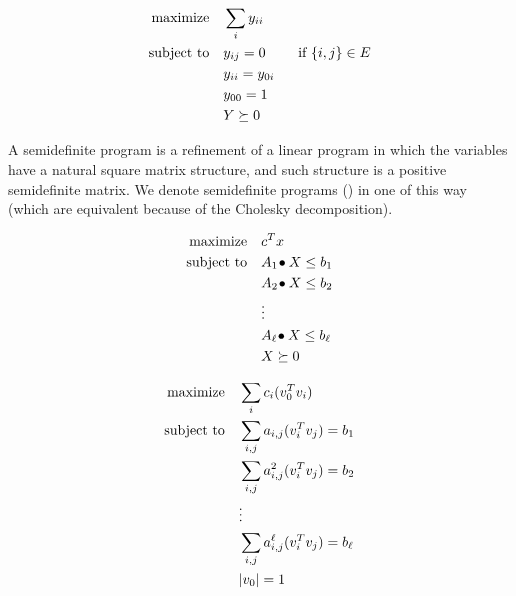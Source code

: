 \documentclass[a4paper,twoside,justified]{tufte-handout}
\begin{document}
\begin{alignat*}{2}
  \text{maximize}\hspace{1em}& \sum_{i}y_{ii}\\
  \text{subject to}\hspace{1em}& y_{ij} =0 \qquad \text{\ if $\{i,j\}\in E$}\\
  & y_{ii} = y_{0i} \\
  & y_{00} = 1\\
  & Y \succeq 0
\end{alignat*}

A semidefinite program is a refinement of a linear program in which
the variables have a natural square matrix structure, and such
structure is a positive semidefinite matrix. We denote semidefinite
programs (\sdp) in one of this way (which are equivalent because of
the Cholesky decomposition).

\begin{figure}
\begin{minipage}[t]{0.5\textwidth}
\begin{alignat*}{2}
  \text{maximize}\hspace{1em}& c^{T}x\\
  \text{subject to}\hspace{1em}& {A_{1}}\!\bullet{X} \leq b_{1}\\
  & {A_{2}}\!\bullet{X} \leq b_{2}\\
  & \vdots \\
  & {A_{\ell}}\!\bullet{X} \leq b_{\ell}\\
  & X \succeq 0
\end{alignat*}
\end{minipage}
\begin{minipage}[t]{0.5\textwidth}
\begin{alignat*}{2}
  \text{maximize}\hspace{1em}& \sum_{i}c_{i} (v_{0}^{T}v_{i}) \\
  \text{subject to}\hspace{1em}& \sum_{i,j} a_{i,j} (v^{T}_{i}v_{j})= b_{1}\\
  & \sum_{i,j} a^{2}_{i,j} (v^{T}_{i}v_{j})= b_{2}\\
  & \vdots \\
  & \sum_{i,j} a^{\ell}_{i,j} (v^{T}_{i}v_{j})= b_{\ell}\\
  & |v_{0}| = 1
\end{alignat*}
\end{minipage}
\end{figure}





\end{document}
